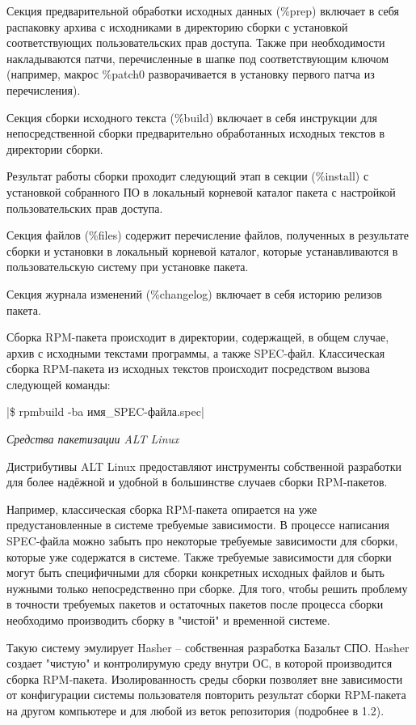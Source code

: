 \documentclass[bachelor, och, pract]{SCWorks}
\begin{document}
Секция предварительной обработки исходных данных (\%prep) включает в себя распаковку архива с исходниками в директорию сборки с установкой соответствующих пользовательских прав доступа.
Также при необходимости накладываются патчи, перечисленные в шапке под соответствующим ключом (например, макрос \%patch0 разворачивается в установку первого патча из перечисления).

Секция сборки исходного текста (\%build) включает в себя инструкции для непосредственной сборки предварительно обработанных исходных текстов в директории сборки.

Результат работы сборки проходит следующий этап в секции (\%install) с установкой собранного ПО в локальный корневой каталог пакета с настройкой пользовательских прав доступа.

Секция файлов (\%files) содержит перечисление файлов, полученных в результате сборки и установки в локальный корневой каталог, которые устанавливаются в пользовательскую систему при установке пакета.

Секция журнала изменений (\%changelog) включает в себя историю релизов пакета\cite{a_rpm-macro}.

Сборка RPM-пакета происходит в директории, содержащей, в общем случае, архив с исходными текстами программы, а также SPEC-файл.
Классическая сборка RPM-пакета из исходных текстов происходит посредством вызова следующей команды:

|\$ rpmbuild -ba имя_SPEC-файла.spec| %

\textit{Средства пакетизации ALT Linux}

Дистрибутивы ALT Linux предоставляют инструменты собственной разработки для более надёжной и удобной в большинстве случаев сборки RPM-пакетов.

Например, классическая сборка RPM-пакета опирается на уже предустановленные в системе требуемые зависимости.
В процессе написания SPEC-файла можно забыть про некоторые требуемые зависимости для сборки, которые уже содержатся в системе.
Также требуемые зависимости для сборки могут быть специфичными для сборки конкретных исходных файлов и быть нужными только непосредственно при сборке.
Для того, чтобы решить проблему в точности требуемых пакетов и остаточных пакетов после процесса сборки необходимо производить сборку в "чистой" и временной системе.

Такую систему эмулирует Hasher -- собственная разработка Базальт СПО.
Hasher создает "чистую" и контролирумую среду внутри ОС, в которой производится сборка RPM-пакета.
Изолированность среды сборки позволяет вне зависимости от конфигурации системы пользователя повторить результат сборки RPM-пакета на другом компьютере и для любой из веток репозитория (подробнее в 1.2).
\end{document}
